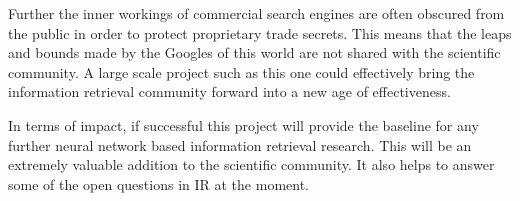 \documentclass[11pt,english,twocolumn]{article}
\begin{document}
Further the inner workings of commercial search engines are often obscured from the public in order to protect proprietary trade secrets. This means that the leaps and bounds made by the Googles of this world are not shared with the scientific community. A large scale project such as this one could effectively bring the information retrieval community forward into a new age of effectiveness.

In terms of impact, if successful this project will provide the baseline for any further neural network based information retrieval research. This will be an extremely valuable addition to the scientific community. It also helps to answer some of the open questions in IR at the moment.








\let\oldbibliography\thebibliography
\renewcommand{\thebibliography}[1]{\oldbibliography{#1}
\setlength{\itemsep}{-3pt}}


{
\scriptsize

}
\end{document}
